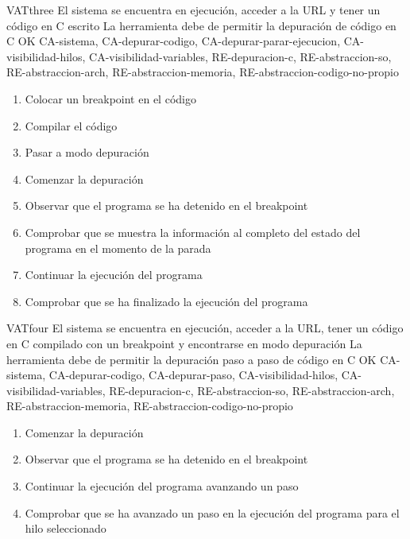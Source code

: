 \begin{testCase}{VAT}{three}
    {El sistema se encuentra en ejecución, acceder a la URL y tener un código en C escrito}
    {\NA}
    {La herramienta debe de permitir la depuración de código en C}
    {OK}
    {CA-sistema, CA-depurar-codigo, CA-depurar-parar-ejecucion, CA-visibilidad-hilos, CA-visibilidad-variables, RE-depuracion-c, RE-abstraccion-so, RE-abstraccion-arch, RE-abstraccion-memoria, RE-abstraccion-codigo-no-propio}
    \begin{enumerate}
        \item Colocar un breakpoint en el código
        \item Compilar el código
        \item Pasar a modo depuración
        \item Comenzar la depuración
        \item Observar que el programa se ha detenido en el breakpoint
        \item Comprobar que se muestra la información al completo del estado del programa en el momento de la parada
        \item Continuar la ejecución del programa
        \item Comprobar que se ha finalizado la ejecución del programa
    \end{enumerate}
\end{testCase}

\begin{testCase}{VAT}{four}
    {El sistema se encuentra en ejecución, acceder a la URL, tener un código en C compilado con un breakpoint y encontrarse en modo depuración}
    {\NA}
    {La herramienta debe de permitir la depuración paso a paso de código en C}
    {OK}
    {CA-sistema, CA-depurar-codigo, CA-depurar-paso, CA-visibilidad-hilos, CA-visibilidad-variables, RE-depuracion-c, RE-abstraccion-so, RE-abstraccion-arch, RE-abstraccion-memoria, RE-abstraccion-codigo-no-propio}
    \begin{enumerate}
        \item Comenzar la depuración
        \item Observar que el programa se ha detenido en el breakpoint
        \item Continuar la ejecución del programa avanzando un paso
        \item Comprobar que se ha avanzado un paso en la ejecución del programa para el hilo seleccionado
    \end{enumerate}
\end{testCase}
    
